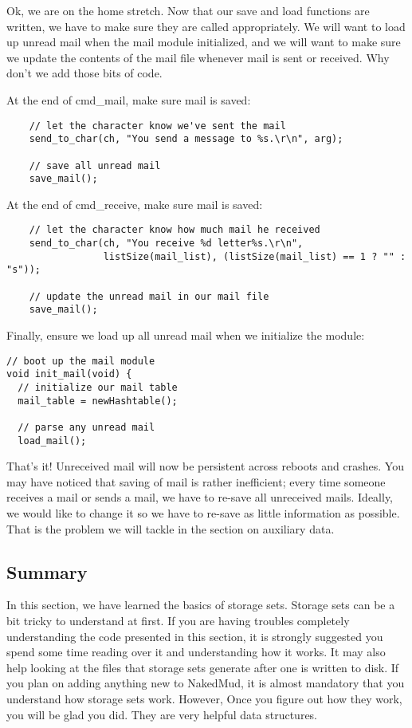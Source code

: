 \documentclass[12pt]{article}
\begin{document}
Ok, we are on the home stretch. Now that our save and load functions are written, we have to make sure they are called appropriately. We will want to load up unread mail when the mail module initialized, and we will want to make sure we update the contents of the mail file whenever mail is sent or received. Why don't we add those bits of code.

At the end of cmd\_mail, make sure mail is saved:
{\bf \begin{verbatim}
    // let the character know we've sent the mail
    send_to_char(ch, "You send a message to %s.\r\n", arg);
    
    // save all unread mail
    save_mail();    
\end{verbatim}} 

At the end of cmd\_receive, make sure mail is saved:
{\bf \begin{verbatim}
    // let the character know how much mail he received
    send_to_char(ch, "You receive %d letter%s.\r\n", 
                 listSize(mail_list), (listSize(mail_list) == 1 ? "" : "s"));
    
    // update the unread mail in our mail file
    save_mail();
\end{verbatim}} 
    
Finally, ensure we load up all unread mail when we initialize the module:    
{\bf \begin{verbatim}
// boot up the mail module
void init_mail(void) {
  // initialize our mail table
  mail_table = newHashtable();

  // parse any unread mail
  load_mail();
\end{verbatim}}

That's it! Unreceived mail will now be persistent across reboots and crashes. You may have noticed that saving of mail is rather inefficient; every time someone receives a mail or sends a mail, we have to re-save all unreceived mails. Ideally, we would like to change it so we have to re-save as little information as possible. That is the problem we will tackle in the section on auxiliary data.



\subsection{Summary}
In this section, we have learned the basics of storage sets. Storage sets can be a bit tricky to understand at first. If you are having troubles completely understanding the code presented in this section, it is strongly suggested you spend some time reading over it and understanding how it works. It may also help looking at the files that storage sets generate after one is written to disk. If you plan on adding anything new to NakedMud, it is almost mandatory that you understand how storage sets work. However, Once you figure out how they work, you will be glad you did. They are very helpful data structures.
\end{document}
